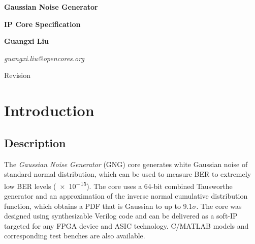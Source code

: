 \documentclass[a4paper, titlepage]{article}
\begin{document}
\begin{titlepage}
\begin{flushleft}
    \normalfont
    {\bfseries\fontsize{32pt}{32pt}\selectfont
    Gaussian Noise Generator}

    \vspace{4ex}
    {\bfseries\fontsize{24pt}{24pt}\selectfont
    IP Core Specification}

    \vspace{20ex}
    {\LARGE\bfseries Guangxi Liu}

    \medskip
    {\Large\itshape guangxi.liu@opencores.org}
\end{flushleft}

\vspace*{\fill}

\begin{flushright}
{\Large Revision }

\medskip
{\Large \oldstylenums{\today}}
\end{flushright}
\end{titlepage}


\tableofcontents
\clearpage


\section{Introduction}

\subsection{Description}
The \emph{Gaussian Noise Generator} (GNG) core generates white Gaussian noise of
standard normal distribution, which can be used to measure BER to
extremely low BER levels (\num{e-15}).
The core uses a 64-bit combined Tausworthe generator and an approximation of
the inverse normal cumulative distribution function,
which obtains a PDF that is Gaussian to up to 9.1$\sigma$.
The core was designed using synthesizable Verilog code and can be delivered as
a soft-IP targeted for any FPGA device and ASIC technology.
C/MATLAB models and corresponding test benches are also available.
\end{document}
